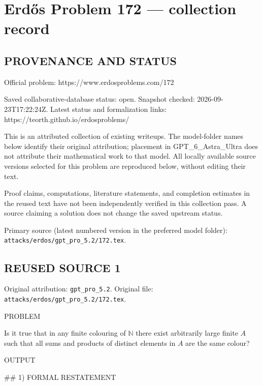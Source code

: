 \section*{Erd\H{o}s Problem 172 --- collection record}

\subsection*{PROVENANCE AND STATUS}
Official problem: https://www.erdosproblems.com/172

Saved collaborative-database status: open.
Snapshot checked: 2026-09-23T17:22:24Z.
Latest status and formalization links: https://teorth.github.io/erdosproblems/

This is an attributed collection of existing writeups. The model-folder names below identify their original attribution; placement in GPT\_6\_Astra\_Ultra does not attribute their mathematical work to that model. All locally available source versions selected for this problem are reproduced below, without editing their text.

Proof claims, computations, literature statements, and completion estimates in the reused text have not been independently verified in this collection pass. A source claiming a solution does not change the saved upstream status.

Primary source (latest numbered version in the preferred model folder): \texttt{attacks/erdos/gpt\_pro\_5.2/172.tex}.

\subsection*{REUSED SOURCE 1}
Original attribution: \texttt{gpt\_pro\_5.2}.
Original file: \texttt{attacks/erdos/gpt\_pro\_5.2/172.tex}.


PROBLEM

Is it true that in any finite colouring of $\mathbb{N}$ there exist arbitrarily large finite $A$ such that all sums and products of distinct elements in $A$ are the same colour?

OUTPUT

## 1) FORMAL RESTATEMENT

